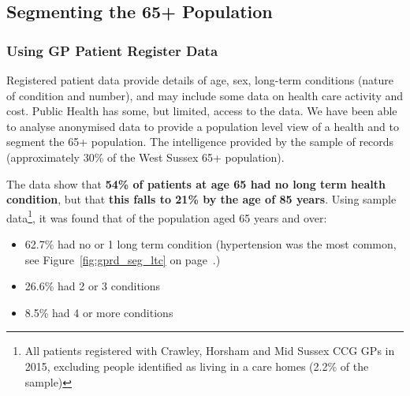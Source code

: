 
\subsection{Segmenting the 65+ Population}
\subsubsection{Using GP Patient Register Data}
Registered patient data provide details of age, sex, long-term conditions (nature of condition and number), and may include some data on health care activity and cost. Public Health has some, but limited, access to the data. We have been able to analyse anonymised data to provide a population level view of a health and to segment the 65+ population. The intelligence provided by the sample of records (approximately 30\% of the West Sussex 65+ population).

The data show that {\bfseries 54\% of patients at age 65 had no long term health condition}, but that {\bfseries this falls to 21\% by the age of 85 years}. Using sample data\footnote{All patients registered with Crawley, Horsham and Mid Sussex CCG GPs in 2015, excluding people identified as living in a care homes (2.2\% of the sample)}, it was found that of the population aged 65 years and over: 
\begin{itemize}[noitemsep]
    \item 62.7\% had no or 1 long term condition (hypertension was the most common, see Figure~\ref{fig:gprd_seg_ltc} on page~\pageref{fig:gprd_seg_ltc}.)
    \item 26.6\% had 2 or 3 conditions
    \item 8.5\% had 4 or more conditions
\end{itemize}


